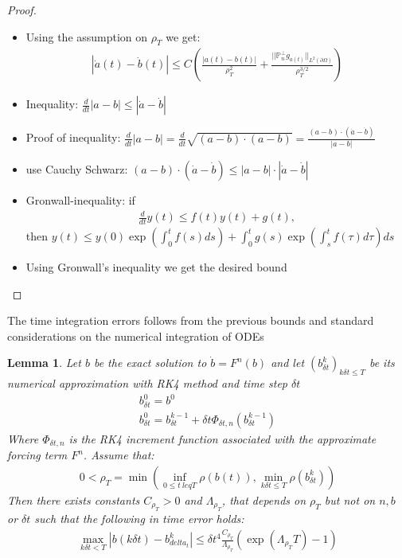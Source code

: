 \documentclass[12pt, a4paper]{article}
\theoremstyle{plain}
\newtheorem{lemma}[theorem]{Lemma}
\theoremstyle{definition}
\begin{document}
\begin{proof}
\begin{itemize}
        \item Using the assumption on $\rho_T$ we get:
        \begin{align}
            |\dot a(t) - \dot b(t)| \leq C (\frac{|a(t) - b(t)|}{\rho_T^2} + \frac{||\mathbb P^\perp_n g_{a(t)}||_{L^2(\partial \Omega)}}{\rho_T^{3/2}})
        \end{align}
        \item Inequality: $\frac{d}{dt} |a-b| \leq |\dot a - \dot b|$
        \item Proof of inequality: $\frac{d}{dt} |a-b| = \frac{d}{dt} \sqrt{(a-b) \cdot (a-b)} = \frac{(a-b) \cdot (\dot a - \dot b)}{|a-b|}$
        \item use Cauchy Schwarz: $(a-b)\cdot (\dot a - \dot b) \leq |a-b| \cdot |\dot a - \dot b|$
        \item Gronwall-inequality: if
        \begin{align}
            \frac{d}{dt} y(t) \leq f(t) y(t) + g(t),
        \end{align}
 then $y(t) \leq y(0) \exp (\int^t_0 f(s) ds) + \int^t_0 g(s) \exp (\int^t_s f(\tau) d\tau) ds$
        \item Using Gronwall's inequality we get the desired bound
        \end{itemize}
\end{proof}


The time integration errors follows from the previous bounds and standard considerations on the numerical integration of ODEs

\begin{lemma}
  Let $b$ be the exact solution to $\dot{b} = F^n (b)$ and let $(b^k_{\delta t})_{k \delta t \leq T}$ be its numerical approximation with RK4 method and time step $\delta t$
  \begin{align}
    b^0_{\delta t} = b^0\\
    b^0_{\delta t} = b^{k-1}_{\delta t} + \delta t \Phi_{\delta t , n} (b^{k-1}_{\delta t})
  \end{align}
Where $\Phi_{\delta t, n}$ is the RK4 increment function associated with the approximate forcing term $F^n$.
Assume that:
\begin{align}
  0 < \rho_T = \min (\inf_{0 \leq t \ leq T} \rho(b(t)), \min_{k \delta t \leq T} \rho (b^k_{\delta t}))
\end{align}
Then there exists constants $C_{\rho_T}>0$ and $\Lambda_{\rho_T}$, that depends on $\rho_T$ but not on $n, b$ or $\delta t$ such that
the following in time error holds:
\begin{align}
  \max_{k \delta t < T} |b(k \delta t) - b^k_{delta_t}| \leq \delta t^4 \frac{C_{\rho_T}}{\Lambda_{\rho_T}} (\exp (\Lambda_{\rho_T} T)- 1)
\end{align}
\end{lemma}
\end{document}
